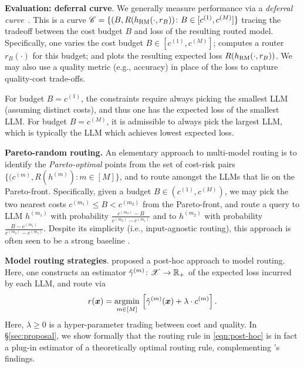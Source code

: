 \textbf{Evaluation: deferral curve}.
We generally measure performance via a \emph{deferral curve}~\citep{Jitkrittum:2023,WanAugRus2024,HuBieLi2024}.
This is a curve 
$\mathscr{C} = \{ ( B, R( h_{\rm RM}( \cdot, r_B ) ) \colon B \in [ c^{(1)}, c^{(M)} ] \}$
tracing the tradeoff between the cost budget $B$ and loss of the resulting routed model.
Specifically, one varies the cost budget $B \in [ c^{(1)}, c^{(M)} ]$;
computes a router $r_B( \cdot )$ for this budget;
and plots
the resulting expected loss  $R( h_{\rm RM}( \cdot, r_B ) )$.
We may also use a quality metric (e.g., accuracy) in place of the loss to 
capture quality-cost trade-offs.


For budget $B = c^{(1)}$,
the constraints require always picking the smallest LLM (assuming distinct costs),
and thus one has the expected loss of the smallest LLM.
For budget $B = c^{(M)}$, 
it is admissible to always pick the largest LLM,
which is typically the LLM which achieves lowest expected loss.

\textbf{Pareto-random routing.}{ 
An elementary approach to multi-model routing is to  identify the \emph{Pareto-optimal} points %
from the set of cost-risk pairs $\{(c^{(m)}, R( h^{(m)}): m \in [M]\}$, and to route amongst the LLMs that lie on the Pareto-front. Specifically, given a budget $B \in ( c^{(1)}, c^{(M)} )$, we may pick the two nearest costs $c^{(m_1)} \leq B <  c^{(m_2)}$ from the Pareto-front, and route a query to LLM $h^{(m_1)}$ with probability $\frac{c^{(m_2)} - B}{c^{(m_2)} - c^{(m_1)}}$ and to $h^{(m_2)}$ with probability $\frac{B - c^{(m_1)}}{c^{(m_2)} - c^{(m_1)}}$. Despite its simplicity (i.e., input-agnostic routing), this approach is often seen to be a strong baseline \citep{HuBieLi2024}.
}

\textbf{Model routing strategies}.
\citet{NarJitMen2022,HuBieLi2024} proposed a 
post-hoc approach to model routing.
Here, one constructs an estimator 
$\hat{\gamma}^{(m)} \colon \mathscr{X} \to \mathbb{R}_+$ of the expected loss incurred by each LLM,
and route via
\begin{equation}
    \label{eqn:post-hoc}
    r( \boldsymbol{x} ) = \underset{m \in [M]}{\operatorname{argmin}} \, \left[ \hat{\gamma}^{(m)}( \boldsymbol{x} ) + \lambda \cdot c^{(m)} \right].
\end{equation}
Here, 
$\lambda \geq 0$ is a hyper-parameter trading between cost and quality.
In \S\ref{sec:proposal}, we show formally that the routing rule in \eqref{eqn:post-hoc} is in fact a plug-in estimator of a theoretically optimal routing rule, complementing \citet{HuBieLi2024}'s findings.


